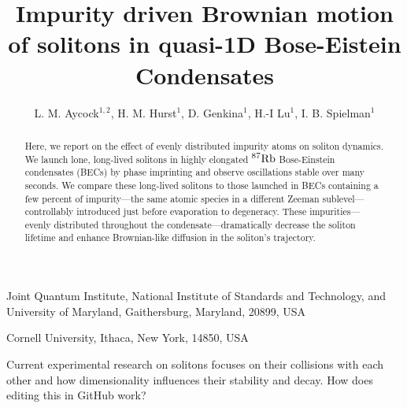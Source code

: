 \documentclass{nature}
\title{Impurity driven Brownian motion of solitons in quasi-1D Bose-Eistein Condensates}
\author{ L. M. Aycock$^{1,2}$, H. M. Hurst$^1$,  D. Genkina$^1$, H.-I Lu$^{1}$, I. B. Spielman$^1$}
\def\Rb87{^{87}\rm{Rb}}					%
\begin{document}
\maketitle
\begin{affiliations}
 \item Joint Quantum Institute, National Institute of Standards and Technology, and University of Maryland, Gaithersburg, Maryland, 20899, USA
 \item Cornell University, Ithaca, New York, 14850, USA
\end{affiliations}

\begin{abstract}
Here, we report on the effect of evenly distributed impurity atoms on soliton dynamics. We launch lone, long-lived solitons in highly elongated $\Rb87$ Bose-Einstein condensates (BECs) by phase imprinting and observe oscillations stable over many seconds. We compare these long-lived solitons to those launched in BECs containing a few percent of impurity---the same atomic species in a different Zeeman sublevel---controllably introduced just before evaporation to degeneracy. These impurities---evenly distributed throughout the condensate---dramatically decrease the soliton lifetime and enhance Brownian-like diffusion in the soliton's trajectory.
\end{abstract}

Current experimental research on solitons focuses on their collisions with each other\cite{Becker2013,Weller2008} and how dimensionality influences their stability and decay\cite{Ku2014}. How does editing this in GitHub work?
\end{document}
